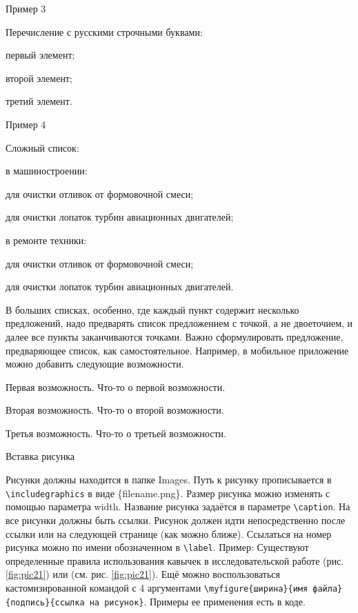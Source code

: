 \documentclass{report}
\begin{document}
\hfill\break %
\hfill\break
\hfill\break

Пример 3

Перечисление с русскими строчными буквами:
\begin{enumasbuk}
  \item первый элемент;
  \item второй элемент;
  \item третий элемент.
\end{enumasbuk}

Пример 4

Сложный список:

\begin{enummarker}
  \item в машиностроении:
    \begin{enumarabic}
        \item для очистки отливок от формовочной смеси;
        \item для очистки лопаток турбин авиационных двигателей;   
    \end{enumarabic}
  \item в ремонте техники:
    \begin{enumarabic}
        \item для очистки отливок от формовочной смеси;
        \item для очистки лопаток турбин авиационных двигателей.  
    \end{enumarabic}
\end{enummarker}


В больших списках,  особенно, где каждый пункт содержит несколько 
предложений, надо предварять список предложением с точкой, а не двоеточием, и далее все пункты заканчиваются точками. Важно сформулировать предложение, предваряющее список, как самостоятельное. Например, в мобильное приложение можно добавить следующие возможности. 
\begin{enummarker}
\item Первая возможность. Что-то о первой возможности.
\item Вторая возможность. Что-то о второй возможности.
\item Третья возможность. Что-то о третьей возможности.
\end{enummarker}


Вставка рисунка

Рисунки должны находится в папке Images. Путь к рисунку прописывается в \verb|\includegraphics|  в виде \{filename.png\}. Размер рисунка можно изменять с помощью параметра width. Название рисунка задаётся в параметре \verb|\caption|. На все рисунки должны быть ссылки. Рисунок должен идти непосредственно после ссылки или на следующей странице (как можно ближе). Ссылаться на номер рисунка можно по имени обозначенном в \verb|\label|. Пример: Существуют определенные правила использования кавычек в исследовательской работе (рис. \ref{fig:pic21}) \break или (см. рис. \ref{fig:pic21}). Ещё можно воспользоваться кастомизированной командой с 4 аргументами \verb|\myfigure{ширина}{имя файла}{подпись}{ссылка на рисунок}|. Примеры ее применения есть в коде.
\end{document}
